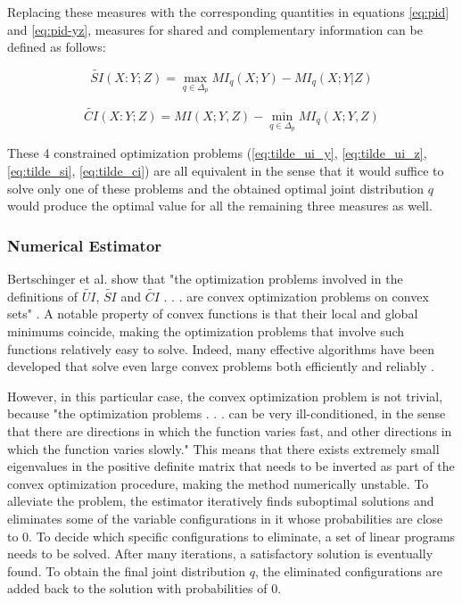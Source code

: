 \documentclass[12pt]{article}
\begin{document}
Replacing these measures with the corresponding quantities in equations \ref{eq:pid} and \ref{eq:pid-yz}, measures for shared and complementary information can be defined as follows: 

\begin{equation}
\widetilde{SI}(X:Y;Z) = \max_{q \in \Delta_p} MI_q (X;Y) - MI_q(X;Y|Z)
\label{eq:tilde_si}
\end{equation}

\begin{equation}
\widetilde{CI}(X:Y;Z) = MI(X;Y,Z) - \min_{q \in \Delta_p} MI_q(X;Y,Z)
\label{eq:tilde_ci}
\end{equation}

These 4 constrained optimization problems (\ref{eq:tilde_ui_y}, \ref{eq:tilde_ui_z}, \ref{eq:tilde_si}, \ref{eq:tilde_ci}) are all equivalent in the sense that it would suffice to solve only one of these problems and the obtained optimal joint distribution $q$ would produce the optimal value for all the remaining three measures as well. 

\subsubsection{Numerical Estimator}

Bertschinger et al. show that "the optimization problems involved in the definitions of $\widetilde{UI}$, $\widetilde{SI}$ and $\widetilde{CI}$ . . . are convex optimization problems on convex sets" \cite{bertschinger}. A notable property of convex functions is that their local and global minimums coincide, making the optimization problems that involve such functions relatively easy to solve. Indeed, many effective algorithms have been developed that solve even large convex problems both efficiently and reliably \cite{boyd}. 

However, in this particular case, the convex optimization problem is not trivial, because "the optimization problems . . . can be very ill-conditioned, in the sense that there are directions in which the function varies fast, and other directions in which the function varies slowly." \cite{bertschinger} This means that there exists extremely small eigenvalues in the positive definite matrix that needs to be inverted as part of the convex optimization procedure, making the method numerically unstable. To alleviate the problem, the estimator iteratively finds suboptimal solutions and eliminates some of the variable configurations in it whose probabilities are close to 0. To decide which specific configurations to eliminate, a set of linear programs needs to be solved. After many iterations, a satisfactory solution is eventually found. To obtain the final joint distribution $q$, the eliminated configurations are added back to the solution with probabilities of 0. 
\end{document}
